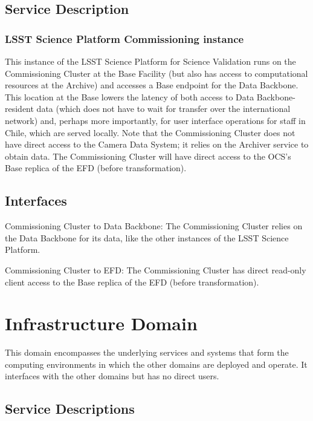 \documentclass[DM,lsstdraft,toc]{lsstdoc}
\begin{document}
\subsection{Service Description}\label{commcluster-service}

\subsubsection{LSST Science Platform Commissioning
instance}\label{lsst-science-platform-commissioning-instance}

This instance of the LSST Science Platform for Science Validation runs
on the Commissioning Cluster at the Base Facility (but also has access
to computational resources at the Archive) and accesses a Base endpoint
for the Data Backbone. This location at the Base lowers the latency of
both access to Data Backbone-resident data (which does not have to wait
for transfer over the international network) and, perhaps more
importantly, for user interface operations for staff in Chile, which are
served locally. Note that the Commissioning Cluster does not have direct
access to the Camera Data System; it relies on the Archiver service to
obtain data. The Commissioning Cluster will have direct access to the
OCS's Base replica of the EFD (before transformation).

\subsection{Interfaces}\label{commcluster-interfaces}

Commissioning Cluster to Data Backbone: The Commissioning Cluster relies on the
Data Backbone for its data, like the other instances of the LSST Science
Platform.

Commissioning Cluster to EFD: The Commissioning Cluster has direct read-only
client access to the Base replica of the EFD (before transformation).


\section{Infrastructure Domain}\label{infrastructure-domain}

This domain encompasses the underlying services and systems that form
the computing environments in which the other domains are deployed and
operate. It interfaces with the other domains but has no direct users.

\subsection{Service Descriptions}\label{infrastructure-service-descriptions}
\end{document}
